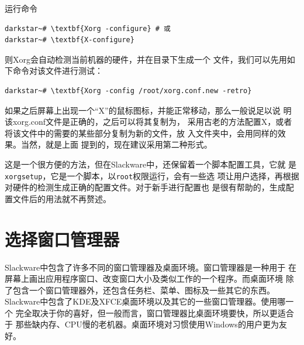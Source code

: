 运行命令
\begin{Verbatim}[frame=single, commandchars=\\\{\}]
darkstar~# \textbf{Xorg -configure} # 或
darkstar~# \textbf{X-configure} 
\end{Verbatim}
则Xorg会自动检测当前机器的硬件，并在目录下生成一个
文件，我们可以先用如下命令对该文件进行测试：
\begin{Verbatim}[frame=single, commandchars=\\\{\}]
darkstar~# \textbf{Xorg -config /root/xorg.conf.new -retro}
\end{Verbatim}
如果之后屏幕上出现一个``X''的鼠标图标，并能正常移动，那么一般说足以说
明该xorg.conf文件是正确的，之后可以将其复制为，
采用古老的方法配置X，或者将该文件中的需要的某些部分复制为新的文件，放
入文件夹中，会用同样的效果。当然，就是上面
提到的，现在建议采用第二种形式。

这是一个很方便的方法，但在Slackware中，还保留着一个脚本配置工具，它就
是\texttt{xorgsetup}，它是一个脚本，以\texttt{root}权限运行，会有一些选
项让用户选择，再根据对硬件的检测生成正确的配置文件。对于新手进行配置也
是很有帮助的，生成配置文件后的用法就不再赘述。

\section{选择窗口管理器}
\label{chap:xconfiguration:select}
Slackware中包含了许多不同的窗口管理器及桌面环境。窗口管理器是一种用于
在屏幕上画出应用程序窗口、改变窗口大小及类似工作的一个程序。而桌面环境
除了包含一个窗口管理器外，还包含任务栏、菜单、图标及一些其它的东西。
Slackware中包含了KDE及XFCE桌面环境以及其它的一些窗口管理器。使用哪一个
完全取决于你的喜好，但一般而言，窗口管理器比桌面环境要快，所以更适合于
那些缺内存、CPU慢的老机器。桌面环境对习惯使用Windows的用户更为友好。

